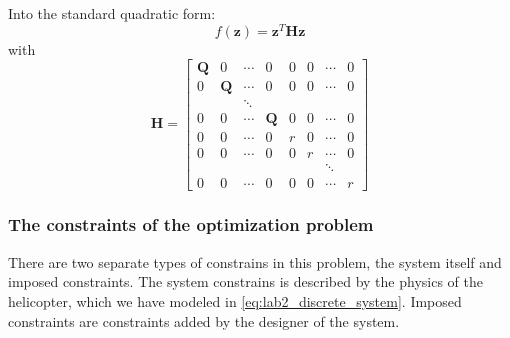 \documentclass[../main.tex]{subfiles}
\begin{document}
Into the standard quadratic form:
\begin{equation}\label{eq:lab2_quadprog}
	f(\bm z) = \bm z^T \bm H \bm z
\end{equation}
with
\begin{equation}\label{eq:lab2_H}
	\bm H = \begin{bmatrix}
		\bm Q & 0 & \cdots  & 0 & 0 & 0 & \cdots & 0\\
		0 & \bm Q & \cdots  & 0 & 0 & 0 & \cdots & 0\\
		 & & \ddots &  &  &  &  & \\
		0 & 0 & \cdots & \bm Q & 0 & 0  & \cdots & 0\\
		0 & 0 & \cdots & 0 & r & 0  & \cdots & 0\\
		0 & 0 & \cdots & 0 & 0 & r  & \cdots & 0\\
		 & &  &  &  &  & \ddots & \\
		0 & 0 & \cdots & 0 & 0 & 0  & \cdots & r
	\end{bmatrix}
\end{equation}


\subsubsection{The constraints of the optimization problem} \label{sec:lab2_constraints}
There are two separate types of constrains in this problem, the system itself and imposed constraints. The system constrains is described by the physics of the helicopter, which we have modeled in \cref{eq:lab2_discrete_system}. Imposed constraints are constraints added by the designer of the system. 
\end{document}
